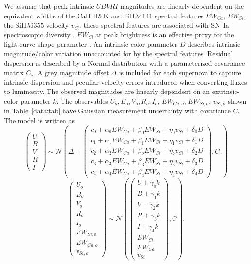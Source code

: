 \documentclass{aastex}   	%
\begin{document}
We assume 
that  peak intrinsic $UBVRI$ magnitudes are linearly dependent
on the equivalent widths of the CaII H\&K and SiII$\lambda$4141 spectral features
$EW_{Ca}$, $EW_{Si}$,
the SiII$\lambda6355$ velocity $v_{Si}$:
these spectral features are associated with SN~Ia  spectroscopic diversity  
\citep{2006PASP..118..560B,2009A&A...500L..17B, 2009PASP..121..238B, 2009ApJ...699L.139W, 2011ApJ...729...55F}.
$EW_{Si}$ at peak brightness is an effective proxy for the light-curve shape parameter
\citep{2011A&A...529L...4C}. 
An intrinsic-color parameter $D$ describes  intrinsic magnitude/color variation unaccounted for by the spectral features.
Residual dispersion is described by a Normal distribution with a parameterized covariance matrix
$C_c$.  A grey magnitude offset $\Delta$ is included for each supernova
to capture intrinsic dispersion and peculiar-velocity errors introduced when converting fluxes to luminosity.
The observed magnitudes are linearly dependent on an
extrinsic-color parameter $k$.  The observables
$U_o, B_o, V_o, R_o, I_o$, $EW_{Ca,o}$, $EW_{Si,o}$, $v_{Si,o}$
shown in Table~\ref{data:tab} have Gaussian measurement uncertainty with covariance $C$.
The model is written as
\begin{equation}
\begin{pmatrix}
U\\B\\V\\R\\I
\end{pmatrix}
\sim \mathcal{N}
\left(
\Delta +
\begin{pmatrix}
c_0+\alpha_0 EW_{Ca} + \beta_0 EW_{Si} + \eta_0 v_{Si} + \delta_0 D\\
c_1+\alpha_1 EW_{Ca} + \beta_1 EW_{Si} + \eta_1 v_{Si} + \delta_1 D \\
c_2+\alpha_2 EW_{Ca} + \beta_2 EW_{Si} + \eta_2 v_{Si} + \delta_2 D\\
c_3+\alpha_3 EW_{Ca} + \beta_3 EW_{Si} + \eta_3 v_{Si} + \delta_3 D\\
c_4+\alpha_4 EW_{Ca} + \beta_4 EW_{Si}+ \eta_4 v_{Si} + \delta_4 D
\end{pmatrix}
,C_{c}
\right)
\label{ewsiv:eqn}
\end{equation}
\begin{equation}
\begin{pmatrix}
U_o\\B_o\\ V_o\\R_o\\I_o\\EW_{Si, o}\\ EW_{Ca, o} \\ v_{Si, o}
\end{pmatrix}
\sim \mathcal{N}
\left(
\begin{pmatrix}
U +\gamma_0 k \\B +\gamma_1 k \\V+\gamma_2 k\\R+\gamma_3 k\\I+\gamma_4 k\\
EW_{Si}\\ EW_{Ca} \\ v_{Si}
\end{pmatrix}
,C
\right).
\label{dust:eqn}
\end{equation}
\end{document}
